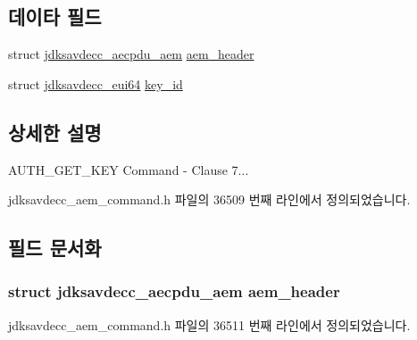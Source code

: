 \subsection*{데이타 필드}
\begin{DoxyCompactItemize}
\item 
struct \hyperlink{structjdksavdecc__aecpdu__aem}{jdksavdecc\+\_\+aecpdu\+\_\+aem} \hyperlink{structjdksavdecc__aem__command__auth__get__key_ae1e77ccb75ff5021ad923221eab38294}{aem\+\_\+header}
\item 
struct \hyperlink{structjdksavdecc__eui64}{jdksavdecc\+\_\+eui64} \hyperlink{structjdksavdecc__aem__command__auth__get__key_a37cbdf6056556ccfaee3ab01dc7c3032}{key\+\_\+id}
\end{DoxyCompactItemize}


\subsection{상세한 설명}
A\+U\+T\+H\+\_\+\+G\+E\+T\+\_\+\+K\+EY Command -\/ Clause 7... 

jdksavdecc\+\_\+aem\+\_\+command.\+h 파일의 36509 번째 라인에서 정의되었습니다.



\subsection{필드 문서화}
\subsubsection[{\texorpdfstring{aem\+\_\+header}{aem_header}}]{\setlength{\rightskip}{0pt plus 5cm}struct {\bf jdksavdecc\+\_\+aecpdu\+\_\+aem} aem\+\_\+header}\hypertarget{structjdksavdecc__aem__command__auth__get__key_ae1e77ccb75ff5021ad923221eab38294}{}\label{structjdksavdecc__aem__command__auth__get__key_ae1e77ccb75ff5021ad923221eab38294}


jdksavdecc\+\_\+aem\+\_\+command.\+h 파일의 36511 번째 라인에서 정의되었습니다.

